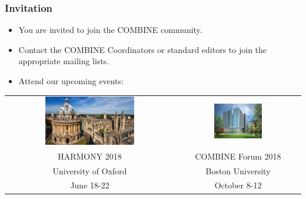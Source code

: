 \documentclass{beamer}
\begin{document}
\begin{frame}\frametitle{Invitation}
\begin{itemize}
\item You are invited to join the COMBINE community.
\item Contact the COMBINE Coordinators or standard editors to join the appropriate mailing lists.
\item Attend our upcoming events:
\end{itemize}
\begin{center}
\begin{tabular}{cc}
\includegraphics[width=0.55\textwidth]{figs/Oxford} &
\includegraphics[width=0.4\textwidth]{figs/BU} \\
HARMONY 2018 & COMBINE Forum 2018 \\
University of Oxford & Boston University \\
 June 18-22 & October 8-12
\end{tabular}
\end{center}
\end{frame}
\end{document}
